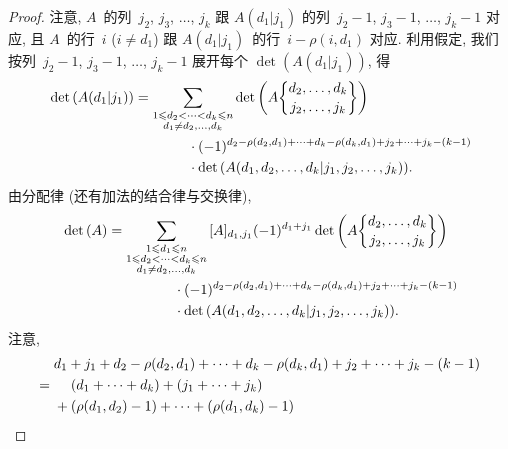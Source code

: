 \documentclass[../libro.tex]{subfiles}
\begin{document}
\begin{proof}
    注意,
    \(A\)~的列~\(j_2\), \(j_3\), \(\dots\), \(j_k\)
    跟 \(A(d_1|j_1)\) 的列~\(j_2 - 1\),
    \(j_3 - 1\), \(\dots\), \(j_k - 1\)
    对应,
    且 \(A\)~的行~\(i\) (\(i \neq d_1\))
    跟 \(A(d_1|j_1)\)~的行~\(i - \rho(i, d_1)\) 对应.
    利用假定,
    我们按列~\(j_2 - 1\), \(j_3 - 1\), \(\dots\), \(j_k - 1\)
    展开每个 \(\det {(A(d_1|j_1))}\),
    得
    \begin{align*}
        &
        \det {(A(d_1|j_1))}
        = \sum_{\substack{
                1 \leq d_2 < \dots < d_k \leq n \\
                d_1 \neq d_2,\dots,d_k
        }}
        {\det {\left(
                    A\submat{d_2, \dots, d_k}{j_2, \dots, j_k}
        \right)}}
        \\
        &
        \qquad \qquad \qquad \qquad \qquad
        \cdot (-1)^{d_2 - \rho(d_2, d_1) + \dots
            + d_k - \rho(d_k, d_1)
        + j_2 + \dots + j_k - (k - 1)}
        \\
        &
        \qquad \qquad \qquad \qquad \qquad
        \cdot \det
        {(A({d_1,d_2,\dots,d_k}|{j_1,j_2,\dots,j_k}))}.
    \end{align*}
    由分配律 (还有加法的结合律与交换律),
    \begin{align*}
        &
        \det {(A)}
        = \sum_{\substack{
                1 \leq d_1 \leq n               \\
                1 \leq d_2 < \dots < d_k \leq n \\
                d_1 \neq d_2,\dots,d_k
        }}
        {[A]_{d_1,j_1}
            (-1)^{d_1 + j_1}
            \det {\left(
                    A\submat{d_2, \dots, d_k}{j_2, \dots, j_k}
        \right)}}
        \\
        &
        \qquad \qquad \qquad \qquad
        \cdot (-1)^{d_2 - \rho(d_2, d_1) + \dots
            + d_k - \rho(d_k, d_1)
        + j_2 + \dots + j_k - (k - 1)}
        \\
        &
        \qquad \qquad \qquad \qquad
        \cdot \det {(A({d_1,d_2,\dots,d_k}|{j_1,j_2,\dots,j_k}))}.
    \end{align*}
    注意,
    \begin{align*}
        &
        d_1 + j_1 + d_2 - \rho(d_2, d_1) + \dots
        + d_k - \rho(d_k, d_1)
        + j_2 + \dots + j_k - (k - 1)
        \\
        = {} &
        \hphantom{{} + {}}
        (d_1 + \dots + d_k) + (j_1 + \dots + j_k)
        \\
        &
        + (\rho(d_1, d_2) - 1) + \dots + (\rho(d_1, d_k) - 1)

\end{align*}
\end{proof}
\end{document}
